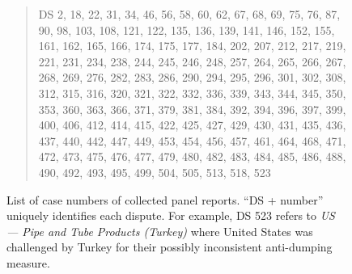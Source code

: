  

\begin{figure}[h]
    \begin{quote}
        DS 2, 
        18, 
        22, 
        31, 
        34, 
        46, 
        56, 
        58, 
        60, 
        62, 
        67, 
        68, 
        69, 
        75, 
        76, 
        87, 
        90, 
        98, 
        103, 
        108, 
        121, 
        122, 
        135, 
        136, 
        139, 
        141, 
        146, 
        152, 
        155, 
        161, 
        162, 
        165, 
        166, 
        174, 
        175, 
        177, 
        184, 
        202, 
        207, 
        212, 
        217, 
        219, 
        221, 
        231, 
        234, 
        238, 
        244, 
        245, 
        246, 
        248, 
        257, 
        264, 
        265, 
        266, 
        267, 
        268, 
        269, 
        276, 
        282, 
        283, 
        286, 
        290, 
        294, 
        295, 
        296, 
        301, 
        302, 
        308, 
        312, 
        315, 
        316, 
        320, 
        321, 
        322, 
        332, 
        336, 
        339, 
        343, 
        344, 
        345, 
        350, 
        353, 
        360, 
        363, 
        366, 
        371, 
        379, 
        381, 
        384, 
        392, 
        394, 
        396, 
        397, 
        399, 
        400, 
        406, 
        412, 
        414, 
        415, 
        422, 
        425, 
        427, 
        429, 
        430, 
        431, 
        435, 
        436, 
        437, 
        440, 
        442, 
        447, 
        449, 
        453, 
        454, 
        456, 
        457, 
        461, 
        464, 
        468, 
        471, 
        472, 
        473, 
        475, 
        476, 
        477, 
        479, 
        480, 
        482, 
        483, 
        484, 
        485, 
        486, 
        488, 
        490, 
        492, 
        493, 
        495, 
        499, 
        504, 
        505, 
        513, 
        518, 
        523
    \end{quote}
    \caption{
        List of case numbers of collected panel reports. ``DS + number'' uniquely identifies each dispute. For example, DS 523 refers to \textit{US — Pipe and Tube Products (Turkey)} where United States was challenged by Turkey for their possibly inconsistent anti-dumping measure.
    }
    \label{fig:ds-cases-used}
\end{figure}

